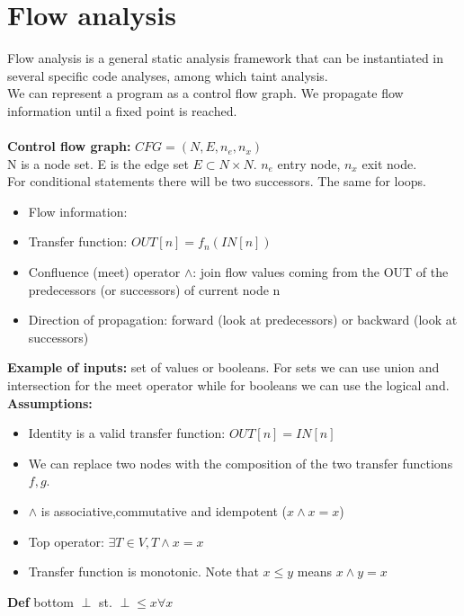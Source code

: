 \documentclass[10pt,a4paper]{book}
\begin{document}
\section{Flow analysis}
Flow analysis is a general static analysis framework that can be instantiated in several specific code analyses, among which taint analysis.\\
We can represent a program as a control flow graph. We propagate flow information until a fixed point is reached.\\\\
\textbf{Control flow graph:} $CFG = (N,E,n_e,n_x)$\\
N is a node set. E is the edge set $E \subset N \times N$. $n_e$ entry node, $n_x$ exit node.\\
For conditional statements there will be two successors. The same for loops.
\begin{itemize}
\item Flow information: 
\item Transfer function: $OUT[n]= f_n(IN[n])$
\item Confluence (meet) operator $\wedge$: join flow values coming from the OUT of the predecessors (or successors) of current node n
\item Direction of propagation: forward (look at predecessors) or backward (look at successors)
\end{itemize}
\textbf{Example of inputs:} set of values or booleans. For sets we can use union and intersection for the meet operator while for booleans we can use the logical and.\\
\textbf{Assumptions:}
\begin{itemize}
\item Identity is a valid transfer function: $OUT[n] = IN[n]$\\
\item We can replace two nodes with the composition of the two transfer functions $f,g$.\\
\item $\wedge$ is associative,commutative and idempotent ($x \wedge x = x$)\\
\item Top operator: $\exists T \in V,T \wedge x = x$\\
\item Transfer function is monotonic. Note that $x \leq y$ means $x \wedge y = x$
\end{itemize}
\textbf{Def} bottom $\perp$ st. $\perp \leq x \forall x$\\
\end{document}
